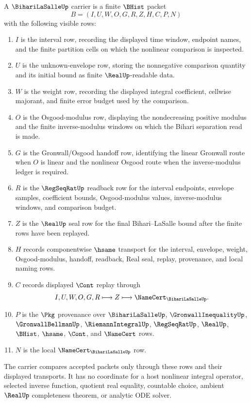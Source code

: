 \begin{definition}
\label{def:bihari-la-salle-carrier}
A $\BihariLaSalleUp$ carrier is a finite $\BHist$ packet
$$
B=(I,U,W,O,G,R,Z,H,C,P,N)
$$
with the following visible rows:
\begin{enumerate}
\item $I$ is the interval row, recording the displayed time window, endpoint names, and the finite partition cells on which the nonlinear comparison is inspected.
\item $U$ is the unknown-envelope row, storing the nonnegative comparison quantity and its initial bound as finite $\RealUp$-readable data.
\item $W$ is the weight row, recording the displayed integral coefficient, cellwise majorant, and finite error budget used by the comparison.
\item $O$ is the Osgood-modulus row, displaying the nondecreasing positive modulus and the finite inverse-modulus windows on which the Bihari separation read is made.
\item $G$ is the Gronwall/Osgood handoff row, identifying the linear Gronwall route when $O$ is linear and the nonlinear Osgood route when the inverse-modulus ledger is required.
\item $R$ is the $\RegSeqRatUp$ readback row for the interval endpoints, envelope samples, coefficient bounds, Osgood-modulus values, inverse-modulus windows, and comparison budget.
\item $Z$ is the $\RealUp$ seal row for the final Bihari--LaSalle bound after the finite rows have been replayed.
\item $H$ records componentwise $\hsame$ transport for the interval, envelope, weight, Osgood-modulus, handoff, readback, Real seal, replay, provenance, and local naming rows.
\item $C$ records displayed $\Cont$ replay through
$$
I,U,W,O,G,R \longmapsto Z \longmapsto \NameCert_{\BihariLaSalleUp}.
$$
\item $P$ is the $\Pkg$ provenance over $\BihariLaSalleUp$, $\GronwallInequalityUp$, $\GronwallBellmanUp$, $\RiemannIntegralUp$, $\RegSeqRatUp$, $\RealUp$, $\BHist$, $\hsame$, $\Cont$, and $\NameCert$ rows.
\item $N$ is the local $\NameCert_{\BihariLaSalleUp}$ row.
\end{enumerate}
The carrier compares accepted packets only through these rows and their displayed transports. It has no coordinate for a host nonlinear integral operator, selected inverse function, quotient real equality, countable choice, ambient $\RealUp$ completeness theorem, or analytic ODE solver.
\end{definition}

